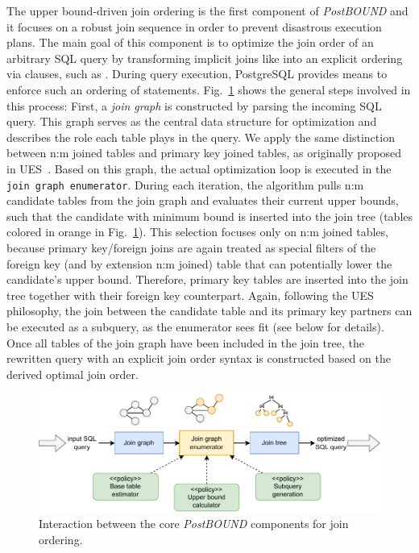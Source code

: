 The upper bound-driven join ordering is the first component of \emph{PostBOUND} and it focuses on a robust join sequence in order to prevent disastrous execution plans.
The main goal of this component is to optimize the join order of an arbitrary SQL query by transforming implicit joins like  into an explicit ordering via  clauses, such as . During query execution, PostgreSQL provides means to enforce such an ordering of  statements.
Fig.~\ref{fig:postbound-interaction} shows the general steps involved in this process:
First, a \emph{join graph} is constructed by parsing the incoming SQL query.
This graph serves as the central data structure for optimization and describes the role each table plays in the query. 
We apply the same distinction between n:m joined tables and primary key joined tables, as originally proposed in UES~\cite{hertzschuch-21-ues}.
Based on this graph, the actual optimization loop is executed in the \texttt{join graph enumerator}. 
During each iteration, the algorithm pulls n:m candidate tables from the join graph and evaluates their current upper bounds, such that the candidate with minimum bound is inserted into the join tree (tables colored in orange in Fig.~\ref{fig:postbound-interaction}).
This selection focuses only on n:m joined tables, because primary key/foreign joins are again treated as special filters of the foreign key (and by extension n:m joined) table that can potentially lower the candidate's upper bound.
Therefore, primary key tables are inserted into the join tree together with their foreign key counterpart. 
Again, following the UES philosophy, the join between the candidate table and its primary key partners can be executed as a subquery, as the enumerator sees fit (see below for details).
Once all tables of the join graph have been included in the join tree, the rewritten query with an explicit join order syntax is constructed based on the derived optimal join order.

\begin{figure}[tb]
	\centering
	\includegraphics[width=0.95\linewidth]{figures/postbound-interaction-rework.pdf}
	\caption{Interaction between the core \emph{PostBOUND} components for join ordering.}
	\label{fig:postbound-interaction}
\end{figure}

